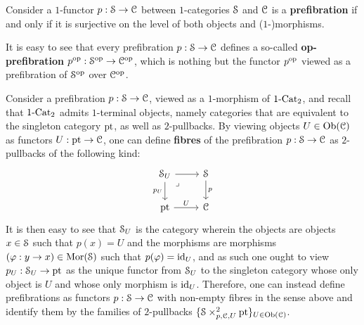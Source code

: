             \begin{definition}[Prefibrations] \label{def: prefibrations}
                Consider a $1$-functor $p: \S \to \C$ between $1$-categories $\S$ and $\C$ is a \textbf{prefibration} if and only if it is surjective on the level of both objects and ($1$-)morphisms. 
            \end{definition}
            \begin{remark}[Op-prefibrations] \label{remark: op_prefibrations}
                It is easy to see that every prefibration $p: \S \to \C$ defines a so-called \textbf{op-prefibration} $p^{\op}: \S^{\op} \to \C^{\op}$, which is nothing but the functor $p^{\op}$ viewed as a prefibration of $\S^{\op}$ over $\C^{\op}$.
            \end{remark}
            \begin{remark} \label{remark: fibres_of_prefibrations}
                Consider a prefibration $p: \S \to \C$, viewed as a $1$-morphism of $1\-\Cat_2$, and recall that $1\-\Cat_2$ admits $1$-terminal objects, namely categories that are equivalent to the singleton category $\pt$, as well as $2$-pullbacks. By viewing objects $U \in \Ob(\C)$ as functors $U: \pt \to \C$, one can define \textbf{fibres} of the prefibration $p: \S \to \C$ as $2$-pullbacks of the following kind:
                    $$
                        \begin{tikzcd}
                        	{\S_U} & \S \\
                        	\pt & \C
                        	\arrow["p", from=1-2, to=2-2]
                        	\arrow["U", from=2-1, to=2-2]
                        	\arrow["{p_U}"', from=1-1, to=2-1]
                        	\arrow[from=1-1, to=1-2]
                        	\arrow["\lrcorner"{anchor=center, pos=0.125}, draw=none, from=1-1, to=2-2]
                        \end{tikzcd}
                    $$
                It is then easy to see that $\S_U$ is the category wherein the objects are objects $x \in \S$ such that $p(x) = U$ and the morphisms are morphisms $(\varphi: y \to x) \in \Mor(\S)$ such that $p(\varphi) = \id_U$, and as such one ought to view $p_U: \S_U \to \pt$ as the unique functor from $\S_U$ to the singleton category whose only object is $U$ and whose only morphism is $\id_U$. Therefore, one can instead define prefibrations as functors $p: \S \to \C$ with non-empty fibres in the sense above and identify them by the families of $2$-pullbacks $\{\S \x^2_{p, \C, U} \pt\}_{U \in \Ob(\C)}$.
            \end{remark}
